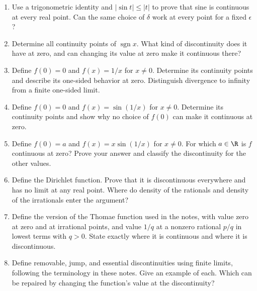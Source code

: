 \begin{enumerate}
  \item Use a trigonometric identity and \(|\sin t|\leq|t|\) to prove
    that sine is continuous at every real point. Can the same choice
    of \(\delta\) work at every point for a fixed \(\epsilon\)?

  \item Determine all continuity points of \(\operatorname{sgn}x\).
    What kind of discontinuity does it have at zero, and can changing
    its value at zero make it continuous there?

  \item Define \(f(0)=0\) and \(f(x)=1/x\) for \(x\ne0\).
    Determine its continuity points and describe its one-sided behavior
    at zero. Distinguish divergence to infinity from a finite one-sided limit.

  \item Define \(f(0)=0\) and \(f(x)=\sin(1/x)\) for \(x\ne0\).
    Determine its continuity points and show why no choice of \(f(0)\)
    can make it continuous at zero.

  \item Define \(f(0)=a\) and \(f(x)=x\sin(1/x)\) for \(x\ne0\).
    For which \(a\in\R\) is \(f\) continuous at zero?
    Prove your answer and classify the discontinuity for the other values.

  \item Define the Dirichlet function. Prove that it is discontinuous
    everywhere and has no limit at any real point. Where do density
    of the rationals and density of the irrationals enter the argument?

  \item Define the version of the Thomae function used in the notes,
    with value zero at zero and at irrational points, and value \(1/q\)
    at a nonzero rational \(p/q\) in lowest terms with \(q>0\).
    State exactly where it is continuous and where it is discontinuous.

  \item Define removable, jump, and essential discontinuities using
    finite limits, following the terminology in these notes.
    Give an example of each. Which can be repaired by changing the
    function's value at the discontinuity?
\end{enumerate}

